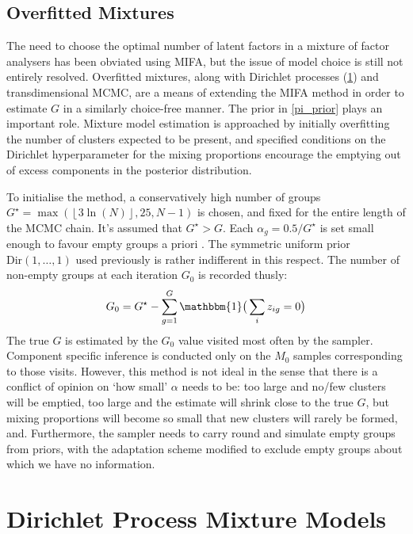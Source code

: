 \documentclass[a4paper,12pt,fleqn]{article}
\numberwithin{equation}{section}
\begin{document}
\subsection[Overfitted Mixtures]{Overfitted Mixtures}
The need to choose the optimal number of latent factors in a mixture of factor analysers has been obviated using MIFA, but the issue of model choice is still not entirely resolved. Overfitted mixtures, along with Dirichlet processes (\ref{Dirichlet}) and transdimensional MCMC, are a means of extending the MIFA method in order to estimate $G$ in a similarly choice-free manner. The prior in \ref{pi_prior}  plays an important role. Mixture model estimation is approached by initially overfitting the number of clusters expected to be present, and specified conditions on the Dirichlet hyperparameter for the  mixing proportions encourage the emptying out of excess components in the posterior distribution. 

To initialise the method, a conservatively high number of groups $G^\star = \max\left(\left\lfloor 3\ln(N)\right\rfloor, 25, N-1\right)$ is chosen, and fixed for the entire length of the MCMC chain. It's assumed that $G^\star > G$. Each $\alpha_g = 0.5/G^\star$ is set small enough to favour empty groups a priori \cite{Ishwaran}. The symmetric uniform prior $\textrm{Dir}\left(1,\ldots,1\right)$ used previously is rather indifferent in this respect. The number of non-empty groups at each iteration $G_0$ is recorded thusly:
\begin{equation}
	G_0 = G^{\star} - \sum_{g=1}^{G} \mathbbm{1}\big(\sum\limits_{i} z_{ig}=0\big)\label{eq:34}
\end{equation}
\label{overfitted}
The true $G$ is estimated by the $G_0$ value visited most often by the sampler. Component specific inference is conducted only on the $M_0$ samples corresponding to those visits. However, this method is not ideal in the sense that there is a conflict of opinion on `how small' $\alpha$ needs to be: too large and no/few clusters will be emptied, too large and the estimate will shrink close to the true $G$, but mixing proportions will become so small that new clusters will rarely be formed, and. Furthermore, the sampler needs to carry round and simulate empty groups from priors, with the adaptation scheme modified to exclude empty groups about which we have no information.

\section[Dirichlet Process Mixture Models]{Dirichlet Process Mixture Models}
\label{Dirichlet}
\end{document}
